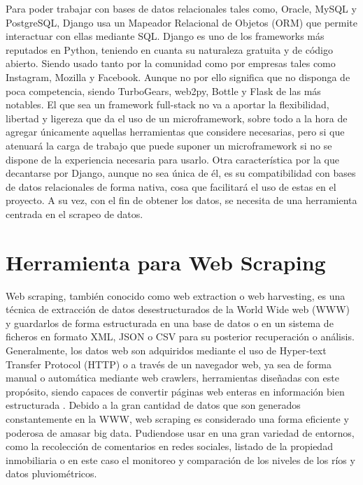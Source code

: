 Para poder trabajar con bases de datos relacionales tales como, Oracle, MySQL y PostgreSQL, Django usa un Mapeador Relacional de Objetos (ORM) que permite interactuar con ellas mediante SQL.\newline
\newline
Django es uno de los frameworks más reputados en Python, teniendo en cuanta su naturaleza gratuita y de código abierto. Siendo usado tanto por la comunidad como por empresas tales como Instagram, Mozilla y Facebook. Aunque no por ello significa que no disponga de poca competencia, siendo TurboGears, web2py, Bottle y Flask de las más notables.
\newline
\newline
El que sea un framework full-stack no va a aportar la flexibilidad, libertad y ligereza que da el uso de un microframework, sobre todo a la hora de agregar únicamente aquellas herramientas que considere necesarias, pero si que atenuará la carga de trabajo que puede suponer un microframework si no se dispone de la experiencia necesaria para usarlo.
\newline
\newline
Otra característica por la que decantarse por Django, aunque no sea única de él, es su compatibilidad con bases de datos relacionales de forma nativa, cosa que facilitará el uso de estas en el proyecto.\newline
\newline
A su vez, con el fin de obtener los datos, se necesita de una herramienta centrada en el scrapeo de datos.

\section{Herramienta para Web Scraping}
Web scraping, también conocido como web extraction o web harvesting, es una técnica de extracción de datos desestructurados de la World Wide web (WWW) y guardarlos de forma estructurada en una base de datos o en un sistema de ficheros en formato XML, JSON o CSV para su posterior recuperación o análisis. Generalmente, los datos web son adquiridos mediante el uso de Hyper-text Transfer Protocol (HTTP) o a través de un navegador web, ya sea de forma manual o automática mediante web crawlers, herramientas diseñadas con este propósito, siendo capaces de convertir páginas web enteras en información bien estructurada \cite{zhao2017web} \cite{krotov2018legality}.
\newline
\newline
Debido a la gran cantidad de datos que son generados constantemente en la WWW, web scraping es considerado una forma eficiente y poderosa de amasar big data. Pudiendose usar en una gran variedad de entornos, como la recolección de comentarios en redes sociales, listado de la propiedad inmobiliaria o en este caso el monitoreo y comparación de los niveles de los ríos y datos pluviométricos.

